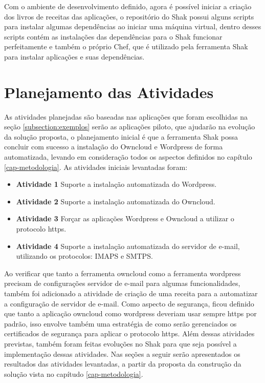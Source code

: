 Com o ambiente de desenvolvimento definido, agora é possível iniciar a criação dos
livros de receitas das aplicações, o repositório do Shak possui alguns scripts
para instalar algumas dependências ao iniciar uma máquina virtual, dentro
desses scripts contém as instalações das dependências para o Shak funcionar perfeitamente
e também o próprio Chef, que é utilizado pela ferramenta Shak para instalar aplicações
e suas dependências.


\section{Planejamento das Atividades}

As atividades planejadas são baseadas nas aplicações que foram escolhidas na seção
\ref{subsection:exemplos} serão as aplicações piloto, que ajudarão na evolução
da solução proposta, o planejamento inicial é que a ferramenta Shak possa concluir com sucesso
a instalação do Owncloud e Wordpress de forma automatizada,
levando em consideração todos os aspectos definidos no capítulo
\ref{cap-metodologia}. As atividades iniciais levantadas foram:

 \begin{itemize}
   \item \textbf{Atividade 1} Suporte a instalação automatizada do Wordpress.
   \item \textbf{Atividade 2} Suporte a instalação automatizada do Owncloud.
   \item \textbf{Atividade 3} Forçar as aplicações Wordpress e Owncloud a
   utilizar o protocolo https.
   \item \textbf{Atividade 4} Suporte a instalação automatizada do servidor de e-mail,
   utilizando os protocolos: IMAPS e SMTPS.
 \end{itemize}

Ao verificar que tanto a ferramenta owncloud como a ferramenta wordpress precisam
de configurações servidor de e-mail para algumas funcionalidades, também foi adicionado
a atividade de criação de uma receita para a automatizar a configuração de
servidor de e-mail. Como aspecto de segurança, ficou definido que tanto a aplicação
owncloud como wordpress deveriam usar sempre https por padrão, isso envolve também
uma estratégia de como serão gerenciados os certificados de segurança para aplicar
o protocolo https. Além dessas atividades previstas, também foram feitas evoluções
no Shak para que seja possível a implementação dessas atividades. Nas seções a
seguir serão apresentados os resultados das atividades levantadas, a partir da
proposta da construção da solução vista no capítudo \ref{cap-metodologia}.

